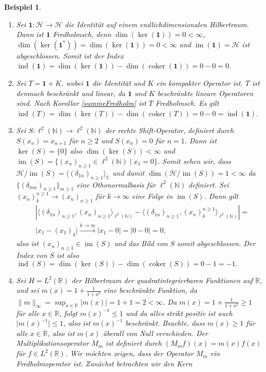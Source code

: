\documentclass[11pt, hidelinks]{article}
\newcommand{\h}{\mathcal{H}}
\newcommand{\im}{\operatorname{im}}
\newcommand{\coker}{\operatorname{coker}}
\numberwithin{conj}{section}
\newtheorem{example}[conj]{Beispiel}
\begin{document}
\begin{example}\noindent
    \begin{enumerate}
        \item Sei $\mathbf{1}: \h \to \h$ die Identität auf einem endlichdimensionalen Hilbertraum. Dann ist $\mathbf{1}$ Fredholmsch, denn $\dim(\ker(\mathbf{1})) = 0 < \infty$, $\dim(\ker(\mathbf{1}^\ast)) = \dim(\ker(\mathbf{1})) = 0 < \infty$ und $\im(\mathbf{1}) = \h$ ist abgeschlossen. Somit ist der Index $\operatorname{ind}(\mathbf{1}) = \dim(\ker(\mathbf{1})) - \dim(\operatorname{coker}(\mathbf{1})) = 0 - 0 = 0$.
        \item Sei \( T = \mathbf{1} + K \), wobei \( \mathbf{1} \) die Identität und \( K \) ein kompakter Operator ist. \( T \) ist demnach beschränkt und linear, da \( \mathbf{1} \) und \( K \) beschränkte lineare Operatoren sind. Nach Korollar \ref{summeFredholm} ist $T$ Fredholmsch. Es gilt $\operatorname{ind}(T) = \dim(\ker(T)) - \dim(\coker(T)) = 0 - 0 = \operatorname{ind}(\mathbf{1})$.
        \item Sei $S: \ell^2(\mathbb{N}) \to \ell^2(\mathbb{N})$ der rechte Shift-Operator, definiert durch $S(x_n) = x_{n+1}$ für $n \geq 2$ und $S(x_n) = 0$ für $n=1$. Dann ist $\ker(S) = \{0\}$ also $\dim(\ker(S)) < \infty$ und $\im(S) = \{ (x_n)_{n \geq 1} \in \ell^2(\mathbb{N}) \; \vert \; x_1 = 0\}$. Somit sehen wir, dass $\h/\im(S) = \langle (\delta_{1n})_{n \geq 1} \rangle_{\mathbb{C}}$ und damit $\dim(\h/\im(S)) = 1 < \infty$ da $\{(\delta_{mn})_{n \geq 1}\}_{m \geq 1}$ eine Othonormalbasis für $\ell^2(\mathbb{N})$ definiert. Sei $(x_n)^{n \geq 1}_k \to (x_n)_{n \geq 1}$ für $k \to \infty$ eine Folge in $\im(S)$. Dann gilt
        \begin{align}
            &\left\vert \langle (\delta_{1n})_{n \geq 1}, (x_n)_{n \geq 1} \rangle_{\ell^2(\mathbb{N})} - \langle (\delta_{1n})_{n \geq 1}, (x_n)^{n \geq 1}_k \rangle_{\ell^2(\mathbb{N})} \right\vert = \nonumber\\
            & \vert x_1 - (x_1)_k \vert \nonumber \xrightarrow[]{k \to \infty} \vert x_1 - 0 \vert = \vert 0 - 0 \vert = 0,
        \end{align}
        also ist $(x_n)_{n \geq 1} \in \im(S)$ und das Bild von $S$ somit abgeschlossen. Der Index von \( S \) ist also $\operatorname{ind}(S) = \dim(\ker(S)) - \dim(\operatorname{coker}(S)) = 0 - 1 = -1.$
        \item Sei \( H = L^2(\mathbb{R}) \) der Hilbertraum der quadratintegrierbaren Funktionen auf \( \mathbb{R} \), und sei $m(x) = 1 + \frac{1}{1 + x^2}$ eine beschränkte Funktion, da $\|m\|_\infty = \sup_{x \in \mathbb{R}} |m(x)| = 1 + 1 = 2 < \infty$. Da \( m(x) = 1 + \frac{1}{1 + x^2} \geq 1 \) für alle \( x \in \mathbb{R} \), folgt \( m(x)^{-1} \leq 1 \) und da alles strikt positiv ist auch \( \vert m(x)^{-1} \vert \leq 1 \), also ist \( m(x)^{-1} \) beschränkt. Beachte, dass \( m(x) \geq 1 \) für alle \( x \in \mathbb{R} \), also ist \( m(x) \) überall von Null verschieden. Der Multiplikationsoperator \( M_m \) ist definiert durch $(M_m f)(x) = m(x) f(x)$ für $f \in L^2(\mathbb{R})$. Wir möchten zeigen, dass der Operator \( M_m \) ein Fredholmoperator ist. Zunächst betrachten wir den Kern

\end{enumerate}
\end{example}
\end{document}
